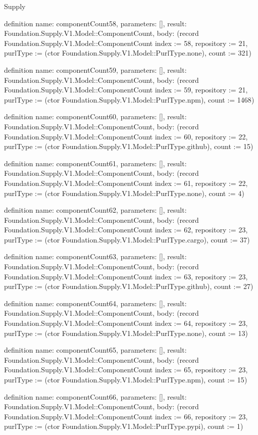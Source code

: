 \begin{lexlean}{Supply}
\begin{semanticmodule}
definition{
  name: componentCount58,
  parameters: [],
  result: Foundation.Supply.V1.Model::ComponentCount,
  body: (record Foundation.Supply.V1.Model::ComponentCount {index := 58, repository := 21, purlType := (ctor Foundation.Supply.V1.Model::PurlType.none), count := 321})
}

definition{
  name: componentCount59,
  parameters: [],
  result: Foundation.Supply.V1.Model::ComponentCount,
  body: (record Foundation.Supply.V1.Model::ComponentCount {index := 59, repository := 21, purlType := (ctor Foundation.Supply.V1.Model::PurlType.npm), count := 1468})
}

definition{
  name: componentCount60,
  parameters: [],
  result: Foundation.Supply.V1.Model::ComponentCount,
  body: (record Foundation.Supply.V1.Model::ComponentCount {index := 60, repository := 22, purlType := (ctor Foundation.Supply.V1.Model::PurlType.github), count := 15})
}

definition{
  name: componentCount61,
  parameters: [],
  result: Foundation.Supply.V1.Model::ComponentCount,
  body: (record Foundation.Supply.V1.Model::ComponentCount {index := 61, repository := 22, purlType := (ctor Foundation.Supply.V1.Model::PurlType.none), count := 4})
}

definition{
  name: componentCount62,
  parameters: [],
  result: Foundation.Supply.V1.Model::ComponentCount,
  body: (record Foundation.Supply.V1.Model::ComponentCount {index := 62, repository := 23, purlType := (ctor Foundation.Supply.V1.Model::PurlType.cargo), count := 37})
}

definition{
  name: componentCount63,
  parameters: [],
  result: Foundation.Supply.V1.Model::ComponentCount,
  body: (record Foundation.Supply.V1.Model::ComponentCount {index := 63, repository := 23, purlType := (ctor Foundation.Supply.V1.Model::PurlType.github), count := 27})
}

definition{
  name: componentCount64,
  parameters: [],
  result: Foundation.Supply.V1.Model::ComponentCount,
  body: (record Foundation.Supply.V1.Model::ComponentCount {index := 64, repository := 23, purlType := (ctor Foundation.Supply.V1.Model::PurlType.none), count := 13})
}

definition{
  name: componentCount65,
  parameters: [],
  result: Foundation.Supply.V1.Model::ComponentCount,
  body: (record Foundation.Supply.V1.Model::ComponentCount {index := 65, repository := 23, purlType := (ctor Foundation.Supply.V1.Model::PurlType.npm), count := 15})
}

definition{
  name: componentCount66,
  parameters: [],
  result: Foundation.Supply.V1.Model::ComponentCount,
  body: (record Foundation.Supply.V1.Model::ComponentCount {index := 66, repository := 23, purlType := (ctor Foundation.Supply.V1.Model::PurlType.pypi), count := 1})
}


\end{semanticmodule}
\end{lexlean}
